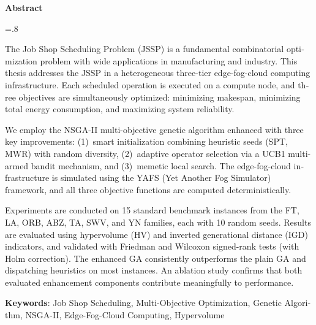 
\begin{latin}

\begin{center}
\textbf{Abstract}
\end{center}
\baselineskip=.8\baselineskip

The Job Shop Scheduling Problem (JSSP) is a fundamental combinatorial optimization problem with wide applications in manufacturing and industry. This thesis addresses the JSSP in a heterogeneous three-tier edge-fog-cloud computing infrastructure. Each scheduled operation is executed on a compute node, and three objectives are simultaneously optimized: minimizing makespan, minimizing total energy consumption, and maximizing system reliability.

We employ the NSGA-II multi-objective genetic algorithm enhanced with three key improvements: (1)~smart initialization combining heuristic seeds (SPT, MWR) with random diversity, (2)~adaptive operator selection via a UCB1 multi-armed bandit mechanism, and (3)~memetic local search. The edge-fog-cloud infrastructure is simulated using the YAFS (Yet Another Fog Simulator) framework, and all three objective functions are computed deterministically.

Experiments are conducted on 15 standard benchmark instances from the FT, LA, ORB, ABZ, TA, SWV, and YN families, each with 10 random seeds. Results are evaluated using hypervolume (HV) and inverted generational distance (IGD) indicators, and validated with Friedman and Wilcoxon signed-rank tests (with Holm correction). The enhanced GA consistently outperforms the plain GA and dispatching heuristics on most instances. An ablation study confirms that both evaluated enhancement components contribute meaningfully to performance.


\bigskip\noindent\textbf{Keywords}:
Job Shop Scheduling, Multi-Objective Optimization, Genetic Algorithm, NSGA-II, Edge-Fog-Cloud Computing, Hypervolume

\end{latin}
